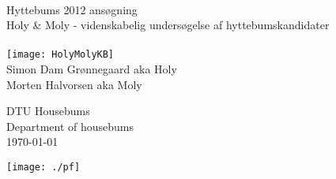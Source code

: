 \begin{titlepage}
\centering \parindent=0pt
 \HRule\\[1cm]\Huge
Hyttebums 2012 ansøgning\\[0.7cm]
\LARGE Holy \& Moly - videnskabelig undersøgelse af hyttebumskandidater\\[1cm]
\HRule\\[2cm]  
\texttt{[image: HolyMolyKB]}\\ %

\Large Simon Dam Grønnegaard aka Holy\\ 
Morten Halvorsen aka Moly


 \normalsize %
\begin{flushleft} \Large
DTU Housebums\\
Department of housebums\\
\today \end{flushleft}
 \normalsize
\begin{flushright}
\texttt{[image: ./pf]}\\
\end{flushright}
\end{titlepage}